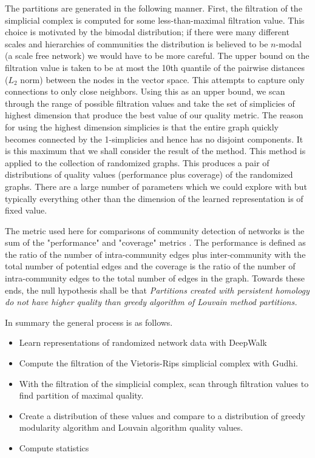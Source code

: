 \documentclass[letter,10pt,openany]{article}
\begin{document}
The partitions are generated in the following manner. First, the filtration of the
simplicial complex is computed for some less-than-maximal filtration value. This choice is motivated
by the bimodal distribution; if there were many different scales and hierarchies of communities
the distribution is believed to be $n$-modal (a scale free network) we would have to be more careful.
The upper bound on the filtration value is taken to be
at most the 10th quantile of the pairwise distances ($L_2$ norm) between the nodes in the
vector space. This attempts to capture only connections to only close neighbors.
Using this as an upper bound, we scan through the range of possible filtration values
and take the set of simplicies of highest dimension that produce the best value of our quality
metric. The reason
for using the highest dimension simplicies is that the entire graph quickly becomes connected by the
1-simplicies and hence has no disjoint components.  It is this
maximum that we shall consider the result of the method.
This method is applied to the collection of randomized
graphs. This produces a pair of distributions of quality values (performance plus coverage)
of the randomized graphs.
There are a large number of parameters which we could
explore with but typically everything other than
the dimension of the learned representation is of fixed value.

The metric used here for comparisons of community detection of networks
is the sum of the "performance" and "coverage" metrics \cite{qualitymetric}.
The performance is defined as
the ratio of the number of intra-community edges plus inter-community with the total
number of potential edges and the coverage is the ratio of the number
of intra-community edges to the total number of edges in the
graph. Towards these ends, the null hypothesis shall be that
\textit{Partitions created with persistent homology do not have higher quality than greedy algorithm
of Louvain method partitions.}

In summary the general process is as follows.
\begin{itemize}
\item Learn representations of randomized network data with DeepWalk
\item Compute the filtration of the Vietoris-Rips simplicial complex with Gudhi.
\item With the filtration of the simplicial complex, scan through filtration
values to find partition of maximal quality.
\item Create a distribution of these values and compare to a distribution of greedy modularity
algorithm and Louvain algorithm quality values.
\item Compute statistics
\end{itemize}
\end{document}
